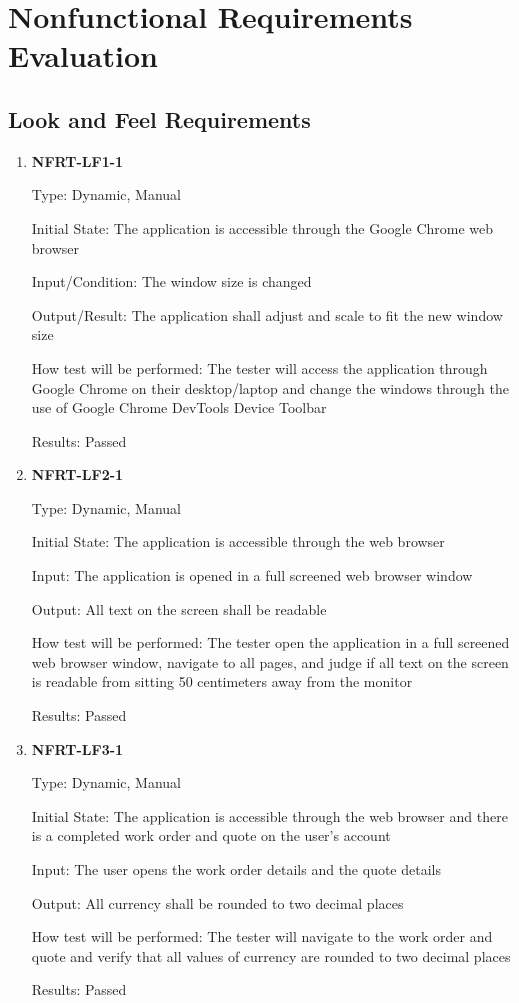 \documentclass[12pt, titlepage]{article}
\begin{document}
\section{Nonfunctional Requirements Evaluation}

\subsection{Look and Feel Requirements}
\begin{enumerate}
	\item \textbf{NFRT-LF1-1}

	      Type: Dynamic, Manual

	      Initial State: The application is accessible through the Google Chrome web browser

	      Input/Condition: The window size is changed

	      Output/Result: The application shall adjust and scale to fit the new window size

	      How test will be performed: The tester will access the application through Google Chrome on their
	      desktop/laptop and change the windows through the use of Google Chrome DevTools Device Toolbar

	      Results: Passed

	\item \textbf{NFRT-LF2-1}

	      Type: Dynamic, Manual

	      Initial State: The application is accessible through the web browser

	      Input: The application is opened in a full screened web browser window

	      Output: All text on the screen shall be readable

	      How test will be performed: The tester open the application in a full screened web browser window,
	      navigate to all pages, and judge if all text on the screen is readable from sitting 50 centimeters
	      away from the monitor

	      Results: Passed

	\item \textbf{NFRT-LF3-1}

	      Type: Dynamic, Manual

	      Initial State: The application is accessible through the web browser and there is a completed work
	      order and quote on the user's account

	      Input: The user opens the work order details and the quote details

	      Output: All currency shall be rounded to two decimal places

	      How test will be performed: The tester will navigate to the work order and quote and verify that
	      all values of currency are rounded to two decimal places

	      Results: Passed

\end{enumerate}
\end{document}

